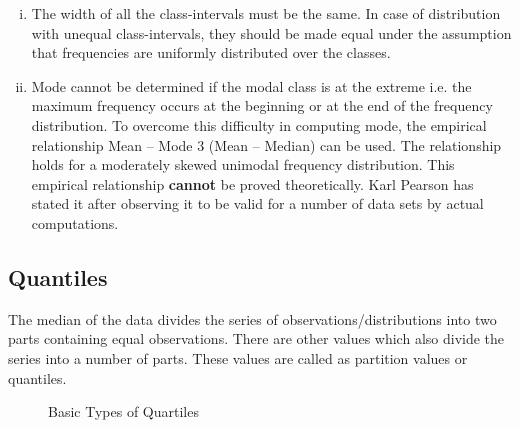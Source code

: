 \documentclass[
10pt, %
a4paper, %
]{report}
\begin{document}
\begin{description}
\begin{enumerate}[Step 1.]
\begin{enumerate}[i.]
\item The width of all the class-intervals must be the same. In case of distribution with unequal class-intervals, they should be made equal under the assumption that frequencies are uniformly distributed over the classes.
\item Mode cannot be determined if the modal class is at the extreme i.e. the maximum frequency occurs at the beginning or at the end of the frequency distribution. To overcome this difficulty in computing mode, the empirical relationship Mean – Mode 3 (Mean – Median) can be used. The relationship holds for a moderately skewed unimodal
frequency distribution. This empirical relationship \textbf{cannot} be proved theoretically. Karl Pearson has stated it after observing it to be valid for a number of data sets by actual computations.
\end{enumerate}
\end{enumerate}
\end{description}

\subsection*{Quantiles}
The median of the data divides the series of observations/distributions into two parts containing equal observations. There are other values which also divide the series into a number of parts. These values are called as partition values or quantiles.
	
\begin{figure}[h!]
\centering
{}
\caption{Basic Types of Quartiles}
\label{fig:quartiletypes}
\end{figure}
\end{document}

